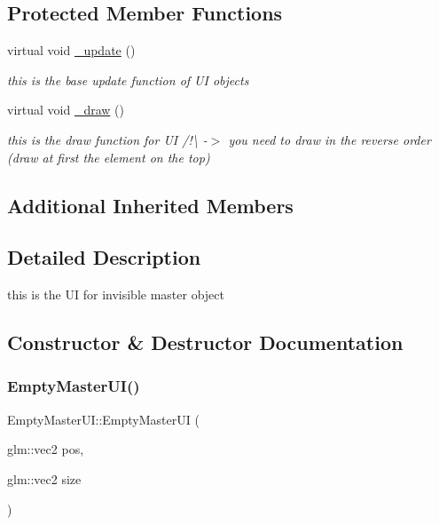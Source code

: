 \subsection*{Protected Member Functions}
\begin{DoxyCompactItemize}
\item 
\mbox{\label{class_empty_master_u_i_a1bf9ef11a2fa21e5637939ec6c959010}} 
virtual void \hyperlink{class_empty_master_u_i_a1bf9ef11a2fa21e5637939ec6c959010}{\+\_\+update} ()
\begin{DoxyCompactList}\small\item\em this is the base update function of UI objects \end{DoxyCompactList}\item 
\mbox{\label{class_empty_master_u_i_a1e2b7cba4b43e28713c7e5d34a80b3a7}} 
virtual void \hyperlink{class_empty_master_u_i_a1e2b7cba4b43e28713c7e5d34a80b3a7}{\+\_\+draw} ()
\begin{DoxyCompactList}\small\item\em this is the draw function for UI /!\textbackslash{} -\/$>$ you need to draw in the reverse order (draw at first the element on the top) \end{DoxyCompactList}\end{DoxyCompactItemize}
\subsection*{Additional Inherited Members}


\subsection{Detailed Description}
this is the UI for invisible master object 

\subsection{Constructor \& Destructor Documentation}
\mbox{\label{class_empty_master_u_i_a05ceb1a35f5a442df0a45dd4f40da8c7}} 
\subsubsection{\texorpdfstring{Empty\+Master\+U\+I()}{EmptyMasterUI()}\hspace{0.1cm}{\footnotesize\ttfamily [1/2]}}
{\footnotesize\ttfamily Empty\+Master\+U\+I\+::\+Empty\+Master\+UI (\begin{DoxyParamCaption}\item[{glm\+::vec2}]{pos,  }\item[{glm\+::vec2}]{size }\end{DoxyParamCaption})}



